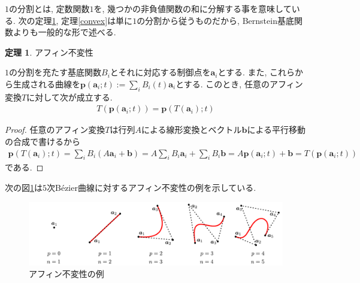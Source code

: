 \documentclass{jsarticle}
\theoremstyle{definition}%
\newtheorem{thm}{定理}
\begin{document}
\newpage
$1$の分割とは, 定数関数$1$を, 幾つかの非負値関数の和に分解する事を意味している.
次の定理\ref{affine}, 定理\ref{convex}は単に$1$の分割から従うものだから, Bernstein基底関数よりも一般的な形で述べる.
\begin{screen}
	\begin{thm}
		\label{affine}
		アフィン不変性\footnotemark

		$1$の分割を充たす基底関数$B_i$とそれに対応する制御点を$\bm{a}_i$とする.
		また, これらから生成される曲線を$\displaystyle\bm{p}(\bm{a}_i;t):=\sum_i B_i(t)\bm{a}_i$とする.
		このとき, 任意のアフィン変換$T$に対して次が成立する.
		\begin{align}
			T(\bm{p}(\bm{a}_i;t))=\bm{p}(T(\bm{a}_i);t)
		\end{align}
	\end{thm}
\end{screen}
\begin{proof}
	任意のアフィン変換$T$は行列$A$による線形変換とベクトル$\bm{b}$による平行移動の合成で書けるから
	\begin{align}
		\bm{p}(T(\bm{a}_i);t)
		=\sum_iB_i(A\bm{a}_i+\bm{b})
		=A\sum_iB_i\bm{a}_i+\sum_iB_i\bm{b}
		=A\bm{p}(\bm{a}_i;t)+\bm{b}
		=T(\bm{p}(\bm{a}_i;t))
	\end{align}
	である.
\end{proof}
次の図\ref{Fig130}は$5$次B\'{e}zier曲線に対するアフィン不変性の例を示している.
\begin{figure}[htbp]
	\centering
    \includegraphics[page=13,clip,width=135mm]{fig.pdf}
	\caption{アフィン不変性の例}
	\label{Fig130}
\end{figure}
\end{document}

